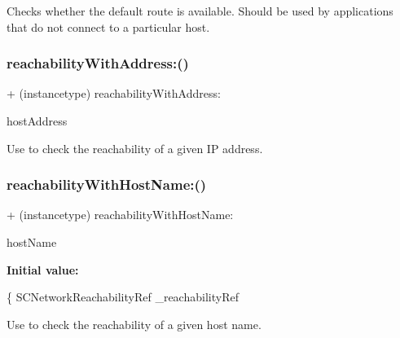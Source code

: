 Checks whether the default route is available. Should be used by applications that do not connect to a particular host. \mbox{\label{interface_n_f_l_o_g_reachability_abc1eb7b16c3025c3e4f8538f0270ea4e}} 
\subsubsection{\texorpdfstring{reachability\+With\+Address\+:()}{reachabilityWithAddress:()}}
{\footnotesize\ttfamily + (instancetype) reachability\+With\+Address\+: \begin{DoxyParamCaption}\item[{(const struct sockaddr $\ast$)}]{host\+Address }\end{DoxyParamCaption}}

Use to check the reachability of a given IP address. \mbox{\label{interface_n_f_l_o_g_reachability_a78e0d1d8c368aa390026e894860854fb}} 
\subsubsection{\texorpdfstring{reachability\+With\+Host\+Name\+:()}{reachabilityWithHostName:()}}
{\footnotesize\ttfamily + (instancetype) reachability\+With\+Host\+Name\+: \begin{DoxyParamCaption}\item[{(N\+S\+String $\ast$)}]{host\+Name }\end{DoxyParamCaption}}

{\bfseries Initial value\+:}
\begin{DoxyCode}
\{
    SCNetworkReachabilityRef \_reachabilityRef
\end{DoxyCode}
Use to check the reachability of a given host name. \mbox{\label{interface_n_f_l_o_g_reachability_acebd4e7f3f879e0a609037856ddc89af}} 
